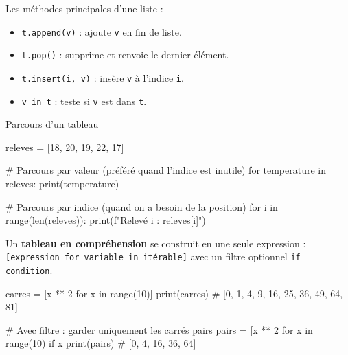 
\begin{nxdef}[D5]
  Les méthodes principales d'une liste :
  \begin{itemize}
    \item \lstinline{t.append(v)} : ajoute \lstinline{v} en fin de liste.
    \item \lstinline{t.pop()} : supprime et renvoie le dernier élément.
    \item \lstinline{t.insert(i, v)} : insère \lstinline{v} à l'indice \lstinline{i}.
    \item \lstinline{v in t} : teste si \lstinline{v} est dans \lstinline{t}.
  \end{itemize}
\end{nxdef}

\begin{codereference}{Parcours d'un tableau}
\begin{python}
releves = [18, 20, 19, 22, 17]

# Parcours par valeur (préféré quand l'indice est inutile)
for temperature in releves:
    print(temperature)

# Parcours par indice (quand on a besoin de la position)
for i in range(len(releves)):
    print(f"Relevé {i} : {releves[i]}")
\end{python}
\end{codereference}


\begin{nxdef}[D6]
  Un \textbf{tableau en compréhension} se construit en une seule expression :
  \lstinline{[expression for variable in itérable]} avec un filtre optionnel
  \lstinline{if condition}.
\end{nxdef}


\begin{python}
carres = [x ** 2 for x in range(10)]
print(carres)  # [0, 1, 4, 9, 16, 25, 36, 49, 64, 81]

# Avec filtre : garder uniquement les carrés pairs
pairs = [x ** 2 for x in range(10) if x %
print(pairs)   # [0, 4, 16, 36, 64]
\end{python}

